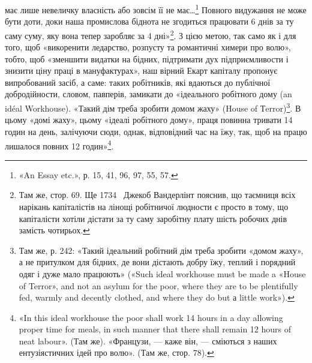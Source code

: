 має лише невеличку власність або зовсім її не має\dots{}\footnote{
«An Essay etc.», р. 15, 41, 96, 97, 55, 57.
} Повного
видужання не може бути доти, доки наша промислова біднота не
згодиться працювати 6 днів за ту саму суму, яку вона тепер заробляє
за 4 дні»\footnote{
Там же, стор. 69. Ще 1734~ Джекоб Вандерлінт пояснив, що таємниця
всіх нарікань капіталістів на лінощі робітничої людности є просто
в тому, що капіталісти хотіли дістати за ту саму заробітну плату шість
робочих днів замість чотирьох.
}. З цією метою, так само як і для того, щоб
«викоренити ледарство, розпусту та романтичні химери про волю»,
тобто, щоб «зменшити видатки на бідних, підтримати дух підприємливости
і знизити ціну праці в мануфактурах», наш вірний
Екарт капіталу пропонує випробований засіб, а саме: таких
робітників, які вдаються до публічної добродійности, словом,
павперів, замикати до «ідеального робітного дому (an idéal Workhouse).
«Такий дім треба зробити домом жаху» (House of Тerror)\footnote{
Там же, р. 242: «Такий ідеальний робітний дім треба зробити «домом
жаху», а не притулком для бідних, де вони дістають добру їжу, теплий
і порядний одяг і дуже мало працюють» («Such ideal workhouse must be
made a «House of Terror», and not an asylum for the poor, where they are
to be plentifully fed, warmly and decently clothed, and where they do but
а little work»).
}.
В цьому «домі жаху», цьому «ідеалі робітного дому», праця повинна
тривати 14 годин на день, залічуючи сюди, однак, відповідний час
на їжу, так, щоб на працю лишалося повних 12 годин»\footnote{
«In this ideal workhouse the poor shall work 14 hours in a day
allowing proper time for meals, in such manner that there shall remain
12 hours of neat labour». (Там же). «Французи, — каже він, — сміються
з наших ентузіястичних ідей про волю». (Там же, стор. 78).
}.

